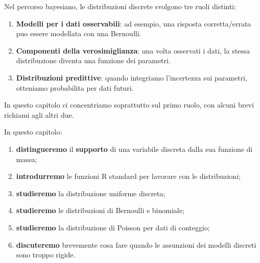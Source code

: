 \documentclass[
  italian,
  letterpaper,
  a4paper,
  11pt,
  open=any]{scrbook}
\providecommand{\tightlist}{%
  \setlength{\itemsep}{0pt}\setlength{\parskip}{0pt}}
\theoremstyle{plain}
\theoremstyle{definition}
\theoremstyle{definition}
\theoremstyle{remark}
\begin{document}
\begin{tcolorbox}[enhanced jigsaw, arc=.35mm, bottomrule=.15mm, bottomtitle=1mm, breakable, colback=white, colbacktitle=quarto-callout-note-color!10!white, colframe=quarto-callout-note-color-frame, coltitle=black, left=2mm, leftrule=.75mm, opacityback=0, opacitybacktitle=0.6, rightrule=.15mm, title=\textcolor{quarto-callout-note-color}{\faInfo}\hspace{0.5em}{Ruolo bayesiano delle distribuzioni discrete}, titlerule=0mm, toprule=.15mm, toptitle=1mm]

Nel percorso bayesiano, le distribuzioni discrete svolgono tre ruoli
distinti:

\begin{enumerate}
\def\labelenumi{\arabic{enumi}.}
\tightlist
\item
  \textbf{Modelli per i dati osservabili}: ad esempio, una risposta
  corretta/errata puo essere modellata con una Bernoulli.
\item
  \textbf{Componenti della verosimiglianza}: una volta osservati i dati,
  la stessa distribuzione diventa una funzione dei parametri.
\item
  \textbf{Distribuzioni predittive}: quando integriamo l'incertezza sui
  parametri, otteniamo probabilita per dati futuri.
\end{enumerate}

In questo capitolo ci concentriamo soprattutto sul primo ruolo, con
alcuni brevi richiami agli altri due.

\end{tcolorbox}

In questo capitolo:

\begin{enumerate}
\def\labelenumi{\arabic{enumi}.}
\tightlist
\item
  \textbf{distingueremo} il \textbf{supporto} di una variabile discreta
  dalla sua funzione di massa;
\item
  \textbf{introdurremo} le funzioni R standard per lavorare con le
  distribuzioni;
\item
  \textbf{studieremo} la distribuzione uniforme discreta;
\item
  \textbf{studieremo} le distribuzioni di Bernoulli e binomiale;
\item
  \textbf{studieremo} la distribuzione di Poisson per dati di conteggio;
\item
  \textbf{discuteremo} brevemente cosa fare quando le assunzioni dei
  modelli discreti sono troppo rigide.
\end{enumerate}
\end{document}
